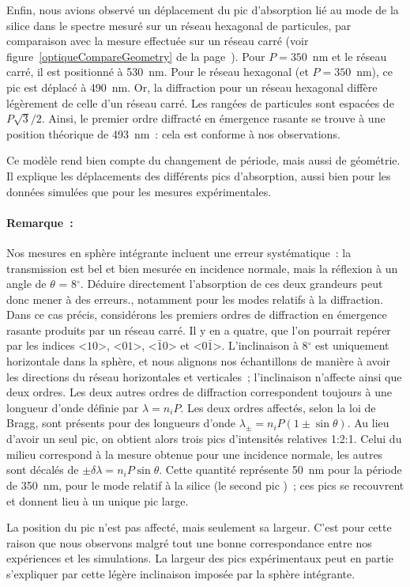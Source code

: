 Enfin, nous avions observé un déplacement du pic d'absorption lié au mode de la silice dans le spectre mesuré sur un réseau hexagonal de particules, par comparaison avec la mesure effectuée sur un réseau carré (voir figure~\ref{optiqueCompareGeometry} de la page~\pageref{optiqueCompareGeometry}). Pour $P = 350$~nm et le réseau carré, il est positionné à 530~nm. Pour le réseau hexagonal (et $P=350$~nm), ce pic est déplacé à 490~nm. Or, la diffraction pour un réseau hexagonal diffère légèrement de celle d'un réseau carré. Les rangées de particules sont espacées de $P\sqrt{3}/2$. Ainsi, le premier ordre diffracté en émergence rasante se trouve à une position théorique de 493~nm~: cela est conforme à nos observations.\par 

Ce modèle rend bien compte du changement de période, mais aussi de géométrie. Il explique les déplacements des différents pics d'absorption, aussi bien pour les données simulées que pour les mesures expérimentales.\par 

\paragraph*{Remarque~:} Nos mesures en sphère intégrante incluent une erreur systématique~: la transmission est bel et bien mesurée en incidence normale, mais la réflexion à un angle de $\theta$ = 8$^\circ$. Déduire directement l'absorption de ces deux grandeurs peut donc mener à des erreurs., notamment pour les modes relatifs à la diffraction. Dans ce cas précis, considérons les premiers ordres de diffraction en émergence rasante produits par un réseau carré. Il y en a quatre, que l'on pourrait repérer par les indices <$10$>, <$01$>, <$\bar{1}0$> et <$0\bar{1}$>. L'inclinaison à 8$^\circ$ est uniquement horizontale dans la sphère, et nous alignons nos échantillons de manière à avoir les directions du réseau horizontales et verticales~; l'inclinaison n'affecte ainsi que deux ordres. Les deux autres ordres de diffraction correspondent toujours à une longueur d'onde définie par $\lambda = n_iP$. Les deux ordres affectés, selon la loi de Bragg, sont présents pour des longueurs d'onde $\lambda_\pm = n_iP(1\pm\sin\theta)$. Au lieu d'avoir un seul pic, on obtient alors trois pics d'intensités relatives {1:2:1}. Celui du milieu correspond à la mesure obtenue pour une incidence normale, les autres sont décalés de $\pm\delta\lambda = n_iP\sin\theta$. Cette quantité représente 50~nm pour la période de 350~nm, pour le mode relatif à la silice (le \og second pic \fg)~; ces pics se recouvrent et donnent lieu à un unique pic large.\par
La position du pic n'est pas affecté, mais seulement sa largeur. C'est pour cette raison que nous observons malgré tout une bonne correspondance entre nos expériences et les simulations. La largeur des pics expérimentaux peut en partie s'expliquer par cette légère inclinaison imposée par la sphère intégrante.\par 
 

